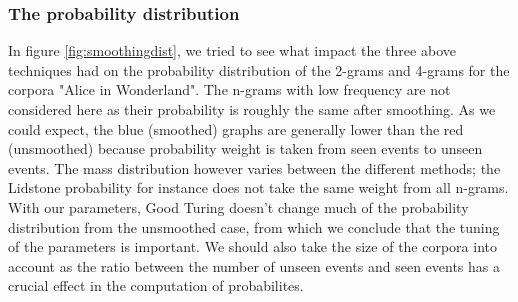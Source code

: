 \documentclass[a4paper,12pt]{article}
\begin{document}
\subsubsection{The probability distribution}
	In figure \ref{fig:smoothingdist}, we tried to see what impact the three above techniques had on the probability distribution of the 2-grams and 4-grams for the corpora "Alice in Wonderland". The n-grams with low frequency are not considered here as their probability is roughly the same after smoothing. As we could expect, the blue (smoothed) graphs are generally lower than the red (unsmoothed) because probability weight is taken from seen events to unseen events. The mass distribution however varies between the different methods; the Lidstone probability for instance does not take the same weight from all n-grams. With our parameters, Good Turing doesn't change much of the probability distribution from the unsmoothed case, from which we conclude that the tuning of the parameters is important. We should also take the size of the corpora into account as the ratio between the number of unseen events and seen events has a crucial effect in the computation of probabilites.
\end{document}

